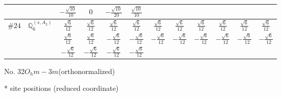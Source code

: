 \documentclass[fleqn,9pt,landscape]{jsarticle}
\begin{document}
\begin{center}
\begin{longtable}{lcccccccccc}
& $ - \frac{\sqrt{10}}{10} $ & $ 0 $ & $ - \frac{\sqrt{10}}{20} $ & $ \frac{\sqrt{10}}{10} $ & $  $ & $  $ & $  $ & $  $ & $  $ & $  $ \\ \hline
$ \#24\quad \mathbb{Q}_{6}^{(s,A_{2})} $ & $ \frac{\sqrt{6}}{12} $ & $ \frac{\sqrt{6}}{12} $ & $ \frac{\sqrt{6}}{12} $ & $ \frac{\sqrt{6}}{12} $ & $ \frac{\sqrt{6}}{12} $ & $ \frac{\sqrt{6}}{12} $ & $ \frac{\sqrt{6}}{12} $ & $ \frac{\sqrt{6}}{12} $ & $ \frac{\sqrt{6}}{12} $ & $ \frac{\sqrt{6}}{12} $ \\
& $ \frac{\sqrt{6}}{12} $ & $ \frac{\sqrt{6}}{12} $ & $ - \frac{\sqrt{6}}{12} $ & $ - \frac{\sqrt{6}}{12} $ & $ - \frac{\sqrt{6}}{12} $ & $ - \frac{\sqrt{6}}{12} $ & $ - \frac{\sqrt{6}}{12} $ & $ - \frac{\sqrt{6}}{12} $ & $ - \frac{\sqrt{6}}{12} $ & $ - \frac{\sqrt{6}}{12} $ \\
& $ - \frac{\sqrt{6}}{12} $ & $ - \frac{\sqrt{6}}{12} $ & $ - \frac{\sqrt{6}}{12} $ & $ - \frac{\sqrt{6}}{12} $ & $  $ & $  $ & $  $ & $  $ & $  $ & $  $ \\
\end{longtable}
\end{center}
\newpage
\begin{center}
\LARGE
No. 32\quad$O_{h}$\quad$m-3m$\quad[ cubic ] (orthonormalized)
\end{center}
\vspace{5mm}
* site positions (reduced coordinate)
\end{document}
